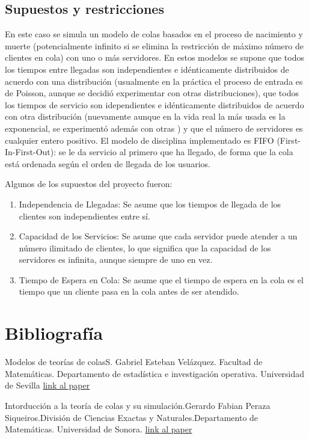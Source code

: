 \documentclass[12pt]{article}
\begin{document}
\subsection{Supuestos y restricciones}

En este caso se simula un  modelo de colas basados en el proceso de nacimiento y muerte (potencialmente infinito si se elimina la restricción de máximo número de clientes en cola) con uno o más servidores. En estos modelos se supone que todos los tiempos entre llegadas son independientes e
idénticamente distribuidos de acuerdo con una distribución (usualmente en la práctica el proceso
de entrada es de Poisson, aunque se decidió experimentar con otras distribuciones), que todos los tiempos de servicio son idependientes e idénticamente
distribuidos de acuerdo con otra distribución (nuevamente aunque en la vida real la más usada es la  exponencial, se experimentó además con otras ) y que el número de servidores es cualquier entero positivo.  El modelo de disciplina implementado es FIFO (First-In-First-Out): se le da servicio al primero que ha llegado, de forma que la
cola está ordenada según el orden de llegada de los usuarios.

Algunos de los supuestos del proyecto fueron:
\begin{enumerate}
\item Independencia de Llegadas: Se asume que los tiempos de llegada de los clientes son independientes entre sí.
\item Capacidad de los Servicios: Se asume que cada servidor puede atender a un número ilimitado de clientes, lo que significa que la capacidad de los servidores es infinita, aunque siempre de uno en vez.
\item Tiempo de Espera en Cola: Se asume que el tiempo de espera en la cola es el tiempo que un cliente pasa en la cola antes de ser atendido.
\end{enumerate}

\section{Bibliografía}
Modelos de teorías de colasS. Gabriel Esteban Velázquez. Facultad de  Matemáticas. Departamento de estadística e investigación operativa. Universidad de Sevilla
 \href{https://idus.us.es/bitstream/handle/11441/77595/Esteban%20Vel%C3%A1zquez%20Gabriel%20TFG.pdf?sequence=1&isAllowed=y}{link al paper}

Intorducción a la teoría de colas y su simulación.Gerardo Fabian Peraza Siqueiros.División de Ciencias Exactas y Naturales.Departamento de Matemáticas. Universidad de Sonora.
 \href{https://lic.mat.uson.mx/tesis/044_Gerardo_FabianPS.pdf}{link al paper}
\end{document}
